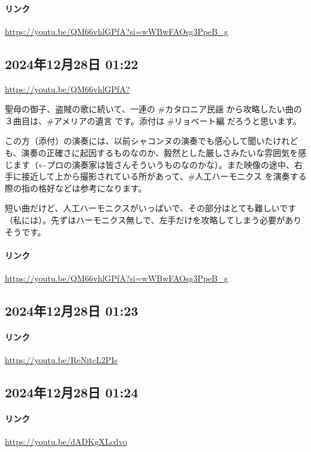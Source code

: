 \paragraph{リンク}
\url{https://youtu.be/QM66vhlGPfA?si=wWBwFAOsg3PpeB_g}

\subsection*{2024年12月28日 01:22}

\url{https://youtu.be/QM66vhlGPfA?}

聖母の御子、盗賊の歌に続いて、一連の \#カタロニア民謡 から攻略したい曲の３曲目は、\#アメリアの遺言 です。添付は \#リョベート編 だろうと思います。

この方（添付）の演奏には、以前シャコンヌの演奏でも感心して聞いたけれども、演奏の正確さに起因するものなのか、毅然とした厳しさみたいな雰囲気を感じます（←プロの演奏家は皆さんそういうものなのかな）。また映像の途中、右手に接近して上から撮影されている所があって、\#人工ハーモニクス を演奏する際の指の格好などは参考になります。

短い曲だけど、人工ハーモニクスがいっぱいで、その部分はとても難しいです（私には）。先ずはハーモニクス無しで、左手だけを攻略してしまう必要がありそうです。

\paragraph{リンク}
\url{https://youtu.be/QM66vhlGPfA?si=wWBwFAOsg3PpeB_g}

\subsection*{2024年12月28日 01:23}

\paragraph{リンク}
\url{https://youtu.be/ReNitcL2PIs}

\subsection*{2024年12月28日 01:24}

\paragraph{リンク}
\url{https://youtu.be/dADKgXLcdvo}

